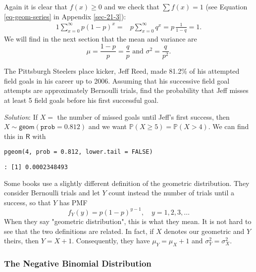 Again it is clear that \(f(x)\geq0\) and we check that \(\sum f(x)=1\)
(see Equation \eqref{eq-geom-series} in Appendix \ref{sec-21-3}):
\begin{alignat*}{1}
\sum_{x=0}^{\infty}p(1-p)^{x}= & p\sum_{x=0}^{\infty}q^{x}=p\,\frac{1}{1-q}=1.
\end{alignat*}
We will find in the next section that the mean and variance are
\begin{equation}
\mu=\frac{1-p}{p}=\frac{q}{p}\mbox{ and }\sigma^{2}=\frac{q}{p^{2}}.
\end{equation}


The Pittsburgh Steelers place kicker, Jeff Reed, made 81.2\% of his
attempted field goals in his career up to 2006. Assuming that his
successive field goal attempts are approximately Bernoulli trials,
find the probability that Jeff misses at least 5 field goals before
his first successful goal.

\emph{Solution}: If \(X=\) the number of missed goals until Jeff's first
success, then \(X\sim\mathsf{geom}(\mathtt{prob}=0.812)\) and we want
\(\mathbb{P}(X\geq5)=\mathbb{P}(X>4)\). We can find this in
\(\mathsf{R}\) with

\begin{verbatim}
pgeom(4, prob = 0.812, lower.tail = FALSE)
\end{verbatim}

\begin{verbatim}
: [1] 0.0002348493
\end{verbatim}



\begin{note}
Some books use a slightly different definition of the geometric
distribution. They consider Bernoulli trials and let \(Y\) count
instead the number of trials until a success, so that \(Y\) has PMF
\begin{equation}
f_{Y}(y)=p(1-p)^{y-1},\quad y=1,2,3,\ldots
\end{equation}
When they say "geometric distribution", this is what they mean. It
is not hard to see that the two definitions are related. In fact, if
\(X\) denotes our geometric and \(Y\) theirs, then
\(Y=X+1\). Consequently, they have \(\mu_{Y}=\mu_{X}+1\) and
\(\sigma_{Y}^{2}=\sigma_{X}^{2}\).
\end{note}

\subsubsection{The Negative Binomial Distribution}
\label{sec-5-6-2-2}

